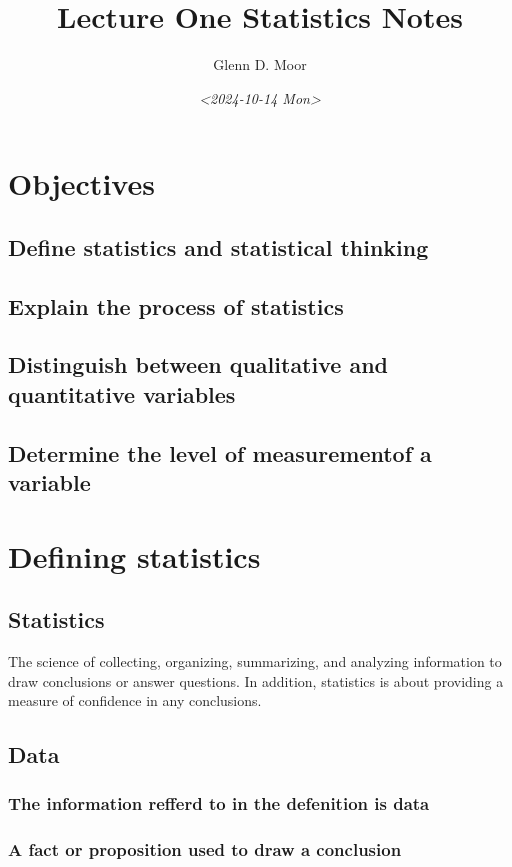 \documentclass[11pt]{article}
\author{Glenn D. Moor}
\date{\textit{<2024-10-14 Mon>}}
\title{Lecture One Statistics Notes}
\begin{document}
\maketitle
\tableofcontents

\section{Objectives}
\label{sec:org8b66cce}
\subsection{Define statistics and statistical thinking}
\label{sec:org283fa5e}
\subsection{Explain the process of statistics}
\label{sec:org39aa6cf}
\subsection{Distinguish between qualitative and quantitative variables}
\label{sec:org4adf659}
\subsection{Determine the level of measurementof a variable}
\label{sec:orgffbc522}
\section{Defining statistics}
\label{sec:org8f54a58}

\subsection{Statistics}
\label{sec:org62053c0}
The science of collecting, organizing, summarizing, and analyzing information to draw conclusions or answer questions.
In addition, statistics is about providing a measure of confidence in any conclusions.
\subsection{Data}
\label{sec:org488707d}

\subsubsection{The information refferd to in the defenition is data}
\label{sec:orgd4c77db}
\subsubsection{A fact or proposition used to draw a conclusion}
\label{sec:org400dfe9}
\end{document}
